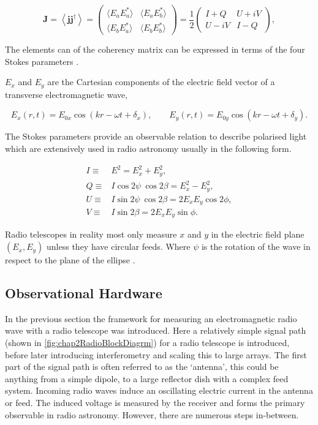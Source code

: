 \begin{equation}
\mathbf{J}
=
\left\langle
\mathbf{j}\mathbf{j}^{\dagger}
\right\rangle
=
\begin{pmatrix}
\langle E_a E_a^{*} \rangle &
\langle E_a E_b^{*} \rangle \\
\langle E_b E_a^{*} \rangle &
\langle E_b E_b^{*} \rangle
\end{pmatrix}
=
\frac{1}{2}
\begin{pmatrix}
I + Q & U + iV \\
U - iV & I - Q
\end{pmatrix}, 
\label{eq:chap2cohermatrix}
\end{equation}

The elements can of the coherency matrix can be expressed in terms of the four Stokes parameters \citep{stokes_xxx_1852}. 

 $E_x$ and $E_y$ are the Cartesian components of the electric field vector of a transverse electromagnetic wave, 

\begin{equation}
    E_x(r,t) = E_{0x}\cos(kr - \omega t + \delta_x), \qquad
E_y(r,t) = E_{0y}\cos(kr - \omega t + \delta_y).
\end{equation}

The Stokes parameters provide an observable relation to describe polarised light which are extensively used in radio astronomy usually in the following form. 

\begin{align}
I \equiv  & E^2 = E^2_x + E^2_y,\\ 
Q \equiv & I \cos 2\psi \ \cos 2\beta = E^2_x - E^2_y,\\
U \equiv  & I \sin 2\psi \ \cos 2\beta = 2 E_x E_y \cos 2 \phi,\\
V \equiv & I \sin 2\beta = 2 E_x E_y \sin \phi.
\end{align}

Radio telescopes in reality most only measure $x$ and $y$ in the electric field plane $(E_x,E_y)$ unless they have circular feeds. Where $\psi$ is the rotation of the wave in respect to the plane of the ellipse \citep[p. 262,][]{pulsar_handbook}. 

\subsection{Observational Hardware}

In the previous section the framework for measuring an electromagnetic radio wave with a radio telescope was introduced. Here a relatively simple signal path (shown in \cref{fig:chap2RadioBlockDiagrm}) for a radio telescope is introduced, before later introducing interferometry and scaling this to large arrays.
The first part of the signal path is often referred to as the `antenna', this could be anything from a simple dipole, to a large reflector dish with a complex feed system. Incoming radio waves induce an oscillating electric current in the antenna or feed. The induced voltage is measured by the receiver and forms the primary observable in radio astronomy. However, there are numerous steps in-between. \\

